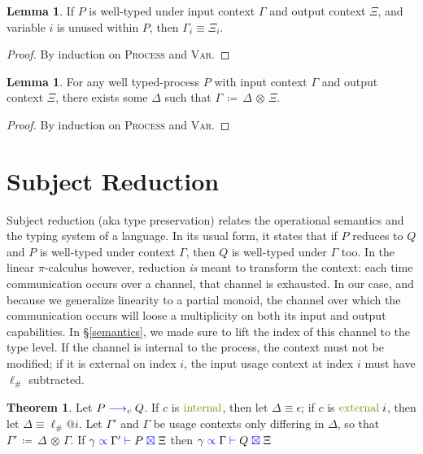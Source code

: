 \documentclass[a4paper,UKenglish,cleveref, autoref, thm-restate,authorcolumns]{lipics-v2019}
\theoremstyle{definition}
\newtheorem{nitheorem}[theorem]{Theorem}
\newtheorem{nilemma}[theorem]{Lemma}
\newcommand{\picalc}{$\pi$-calculus}
\newcommand{\type}[1]{\textcolor{blue}{\operatorname{#1}}}
\newcommand{\constr}[1]{\textcolor{olive}{\operatorname{#1}}}
\newcommand{\opctx}[3]{#1 \, \coloneqq \, #2 \, \otimes \, #3}
\newcommand{\reduce}[1]{\; \type{\longrightarrow}_{#1} \;}
\newcommand{\types}[4]{#1 \; \type{\propto} \; #2 \; \type{\vdash} \; #3 \; \type{\boxtimes} \; #4}
\begin{document}
\begin{nilemma}
  \label{lm:types-unused}
  If $P$ is well-typed under input context $\Gamma$ and output context $\Xi$, and variable $i$ is unused within $P$, then $\Gamma_i \equiv \Xi_i$.
\end{nilemma}
\begin{proof}
  By induction on \textsc{Process} and \textsc{Var}.
\end{proof}

\begin{nilemma}
  \label{lm:types-op}
  For any well typed-process $P$ with input context $\Gamma$ and output context $\Xi$, there exists some $\Delta$ such that $\opctx{\Gamma}{\Delta}{\Xi}$.
\end{nilemma}
\begin{proof}
  By induction on \textsc{Process} and \textsc{Var}.
\end{proof}

\section{Subject Reduction}
\label{subject-reduction}

Subject reduction (aka type preservation) relates the operational semantics and the typing system of a language.
In its usual form, it states that if $P$ reduces to $Q$ and $P$ is well-typed under context $\Gamma$, then $Q$ is well-typed under $\Gamma$ too.
In the linear \picalc{} however, reduction \emph{is} meant to transform the context: each time communication occurs over a channel, that channel is exhausted.
In our case, and because we generalize linearity to a partial monoid, the channel over which the communication occurs will loose a multiplicity on both its input and output capabilities.
In \S \ref{semantics}, we made sure to lift the index of this channel to the type level.
If the channel is internal to the process, the context must not be modified; if it is external on index $i$, the input usage context at index $i$ must have $\ell_\#$ subtracted.

\begin{nitheorem}
  Let $P \reduce{c} Q$.
  If $c$ is $\constr{internal}$, then let $\Delta \equiv \epsilon$;
  if $c$ is $\constr{external}\; i$, then let $\Delta \equiv \ell_\# @ i$.
  Let $\Gamma'$ and $\Gamma$ be usage contexts only differing in $\Delta$, so that $\opctx{\Gamma'}{\Delta}{\Gamma}$.
  If $\types{\gamma}{\Gamma'}{P}{\Xi}$ then $\types{\gamma}{\Gamma}{Q}{\Xi}$
\end{nitheorem}
\end{document}
